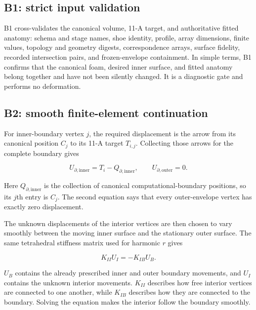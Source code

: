 \documentclass[11pt]{article}
\begin{document}
\subsection{B1: strict input validation}

B1 cross-validates the canonical volume, 11-A target, and authoritative fitted anatomy:
schema and stage names, shoe identity, profile, array dimensions, finite values,
topology and geometry digests, correspondence arrays, surface fidelity, recorded
intersection pairs, and frozen-envelope containment. In simple terms, B1 confirms that
the canonical foam, desired inner surface, and fitted anatomy belong together and have
not been silently changed. It is a diagnostic gate and performs no deformation.

\subsection{B2: smooth finite-element continuation}

For inner-boundary vertex $j$, the required displacement is the arrow from its canonical
position $C_j$ to its 11-A target $T_{i,j}$. Collecting those arrows for the complete
boundary gives

\begin{equation}
  U_{\partial,\mathrm{inner}}=T_i-Q_{\partial,\mathrm{inner}},
  \qquad
  U_{\partial,\mathrm{outer}}=0.
\end{equation}

Here $Q_{\partial,\mathrm{inner}}$ is the collection of canonical computational-boundary
positions, so its $j$th entry is $C_j$. The second equation says that every outer-envelope
vertex has exactly zero displacement.

The unknown displacements of the interior vertices are then chosen to vary smoothly
between the moving inner surface and the stationary outer surface. The same tetrahedral
stiffness matrix used for harmonic $r$ gives

\begin{equation}
  K_{II}U_I=-K_{IB}U_B.
  \label{eq:b2-fem}
\end{equation}

$U_B$ contains the already prescribed inner and outer boundary movements, and $U_I$
contains the unknown interior movements. $K_{II}$ describes how free interior vertices
are connected to one another, while $K_{IB}$ describes how they are connected to the
boundary. Solving the equation makes the interior follow the boundary smoothly.
\end{document}
